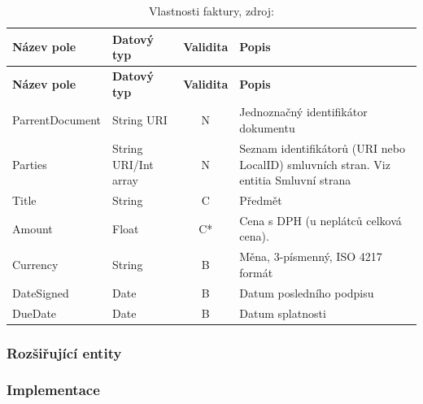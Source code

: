\begin{center}
\begin{longtable}{lp{20mm}cp{65mm}}
\label{grid_mlmmh} \\
\multicolumn{1}{l}{\textbf{Název pole}} & 
\multicolumn{1}{l}{\textbf{Datový typ}} & 
\multicolumn{1}{l}{\textbf{Validita}} & 
\multicolumn{1}{l}{\textbf{Popis}} \\ \hline 
\endfirsthead
\multicolumn{1}{l}{\textbf{Název pole}} & 
\multicolumn{1}{l}{\textbf{Datový typ}} & 
\multicolumn{1}{l}{\textbf{Validita}} & 
\multicolumn{1}{l}{\textbf{Popis}} \\ \hline 
\hline
\endhead
\endfoot
\caption{Vlastnosti faktury, zdroj:\protect\cite{metodika}}
\endlastfoot
ParrentDocument & String URI & N & Jednoznačný identifikátor dokumentu \\
Parties & String URI/Int array & N & Seznam identifikátorů (URI nebo LocalID) smluvních stran. Viz entitia Smluvní strana \\
\rowcolor{validateC}Title & String & C & Předmět \\
\rowcolor{validateC}Amount & Float & C* & Cena s DPH (u neplátců celková cena). \\
\rowcolor{validateB}Currency & String & B & Měna, 3-písmenný, ISO 4217 formát \\
\rowcolor{validateB}DateSigned & Date & B & Datum posledního podpisu \\
\rowcolor{validateB}DueDate & Date & B & Datum splatnosti \\
\end{longtable}
\end{center}

\subsubsection*{Rozšiřující entity}

\subsubsection*{Implementace}

